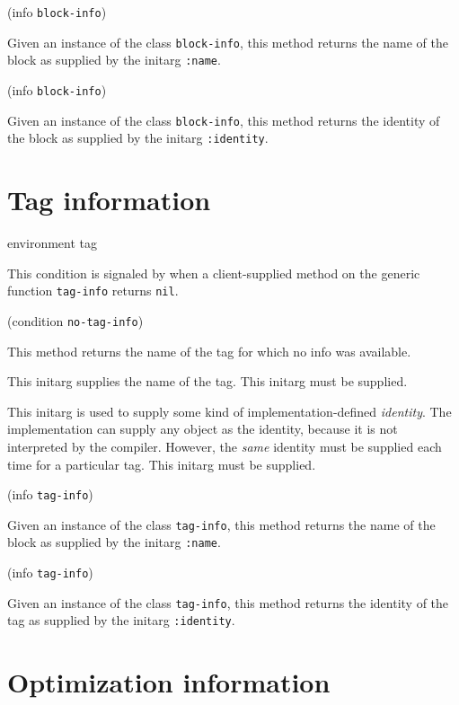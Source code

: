  {(info {\tt block-info})}

Given an instance of the class \texttt{block-info}, this method
returns the name of the block as supplied by the initarg
\texttt{:name}.

 {(info {\tt block-info})}

Given an instance of the class \texttt{block-info}, this method
returns the identity of the block as supplied by the initarg
\texttt{:identity}.

\section{Tag information}

 {environment tag}


This condition is signaled by \sysname{} when a client-supplied method
on the generic function \texttt{tag-info} returns \texttt{nil}.

 {(condition {\tt no-tag-info})}

This method returns the name of the tag for which no info was
available. 



This initarg supplies the name of the tag.  This initarg must be
supplied.


This initarg is used to supply some kind of implementation-defined 
\emph{identity}.  The implementation can supply any object as the
identity, because it is not interpreted by the compiler.  However, the
\emph{same} identity must be supplied each time for a particular
tag.  This initarg must be supplied. 

 {(info {\tt tag-info})}

Given an instance of the class \texttt{tag-info}, this method
returns the name of the block as supplied by the initarg
\texttt{:name}.

 {(info {\tt tag-info})}

Given an instance of the class \texttt{tag-info}, this method
returns the identity of the tag as supplied by the initarg
\texttt{:identity}.

\section{Optimization information}

